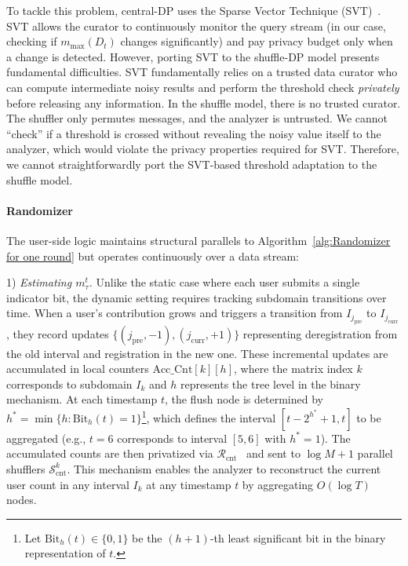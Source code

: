 To tackle this problem, central-DP uses the {Sparse Vector Technique (SVT)}~\cite{dwork2009complexity}.
SVT allows the curator to continuously monitor the query stream (in our case, checking if $m_{\max}(D_t)$ changes significantly) and pay privacy budget only when a change is detected.
However, porting SVT to the shuffle-DP model presents fundamental difficulties.
SVT fundamentally relies on a {trusted data curator} who can compute intermediate noisy results and perform the threshold check \textit{privately} before releasing any information. 
In the shuffle model, there is no trusted curator. The shuffler only permutes messages, and the analyzer is untrusted. We cannot ``check'' if a threshold is crossed without revealing the noisy value itself to the analyzer, which would violate the privacy properties required for SVT. 
Therefore, we cannot straightforwardly port the SVT-based threshold adaptation to the shuffle model.
\paragraph{Randomizer} The user-side logic maintains structural parallels to Algorithm~\ref{alg:Randomizer for one round} but operates continuously over a data stream:

    1) \textit{Estimating $m_\tau^t$.} Unlike the static case where each user submits a single indicator bit, the dynamic setting requires tracking subdomain transitions over time. When a user's contribution grows and triggers a transition from $I_{j_{\text{pre}}}$ to $I_{j_{\text{curr}}}$, they record updates $\{(j_{\text{pre}}, -1), (j_{\text{curr}}, +1)\}$ representing deregistration from the old interval and registration in the new one. These incremental updates are accumulated in local counters $\text{Acc\_Cnt}[k][h]$, where the matrix index $k$ corresponds to subdomain $I_k$ and $h$ represents the tree level in the binary mechanism. At each timestamp $t$, the flush node is determined by $h^* = \min\{h : \text{Bit}_h(t) = 1\}$\footnote{Let $\text{Bit}_h(t) \in \{0, 1\}$ be the $(h + 1)$-th least significant bit in the binary representation of $t$.}, which defines the interval $[t - 2^{h^*} + 1, t]$ to be aggregated (e.g., $t=6$ corresponds to interval $[5,6]$ with $h^*=1$). The accumulated counts are then privatized via $\mathcal{R}_{\text{cnt}}$~\cite{ghazi2021differentially} and sent to $\log M+1$ parallel shufflers $\mathcal{S}^k_{\text{cnt}}$. This mechanism enables the analyzer to reconstruct the current user count in any interval $I_k$ at any timestamp $t$ by aggregating $O(\log T)$ nodes.
    
